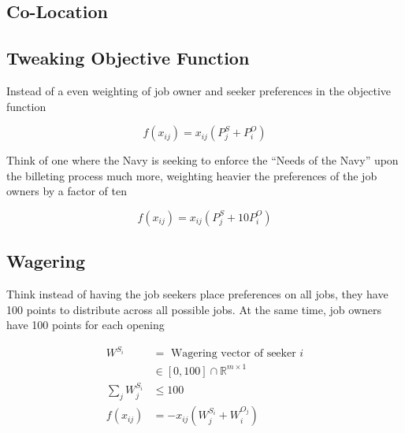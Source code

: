 \subsection{Co-Location}



\subsection{Tweaking Objective Function}

Instead of a even weighting of job owner and seeker preferences in the objective function

\[f(x_{ij}) = x_{ij}(P^S_j + P^O_i)\]

Think of one where the Navy is seeking to enforce the ``Needs of the Navy'' upon the billeting process much more, weighting heavier the preferences of the job owners by a factor of ten

\[f(x_{ij}) = x_{ij}(P^S_j + 10P^O_i)\]

\subsection{Wagering}

Think instead of having the job seekers place preferences on all jobs, they have 100 points to distribute across all possible jobs. At the same time, job owners have 100 points for each opening

\begin{align*}
W^{S_i} &= \text{ Wagering vector of seeker $i$} \\
& \in [0,100] \cap \mathbb{R}^{m \times 1} \\
\sum_j W^{S_i}_{j} &\leq 100 \\
f(x_{ij})&= -x_{ij}(W^{S_i}_j + W^{O_j}_i)
\end{align*}